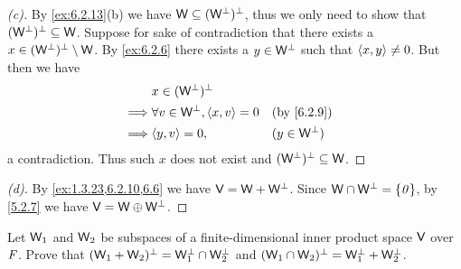 \begin{proof}[(c)]
  By \cref{ex:6.2.13}(b) we have \(\mathsf{W} \subseteq (\mathsf{W}^{\perp})^{\perp}\), thus we only need to show that \((\mathsf{W}^{\perp})^{\perp} \subseteq \mathsf{W}\).
  Suppose for sake of contradiction that there exists a \(x \in (\mathsf{W}^{\perp})^{\perp} \setminus \mathsf{W}\).
  By \cref{ex:6.2.6} there exists a \(y \in \mathsf{W}^{\perp}\) such that \(\left\langle x, y\right\rangle \neq 0\).
  But then we have
  \begin{align*}
             & x \in (\W^{\perp})^{\perp}                                       \\
    \implies & \forall v \in \W^{\perp}, \inn{x, v} = 0 &  & \by{6.2.9}         \\
    \implies & \inn{y, v} = 0,                          &  & (y \in \W^{\perp})
  \end{align*}
  a contradiction.
  Thus such \(x\) does not exist and \((\mathsf{W}^{\perp})^{\perp} \subseteq \mathsf{W}\).
\end{proof}

\begin{proof}[(d)]
  By \cref{ex:1.3.23,6.2.10,6.6} we have \(\mathsf{V} = \mathsf{W} + \mathsf{W}^{\perp}\).
  Since \(\mathsf{W} \cap \mathsf{W}^{\perp} = \left\lbrace\mathit{0}\right\rbrace\), by \cref{5.2.7} we have \(\mathsf{V} = \mathsf{W} \oplus \mathsf{W}^{\perp}\).
\end{proof}

\begin{ex}\label{ex:6.2.14}
  Let \(\mathsf{W}_1\) and \(\mathsf{W}_2\) be subspaces of a finite-dimensional inner product space \(\mathsf{V}\) over \(\mathit{F}\).
  Prove that \((\mathsf{W}_1 + \mathsf{W}_2)^{\perp} = \mathsf{W}_1^{\perp} \cap \mathsf{W}_2^{\perp}\) and \((\mathsf{W}_1 \cap \mathsf{W}_2)^{\perp} = \mathsf{W}_1^{\perp} + \mathsf{W}_2^{\perp}\).
\end{ex}

